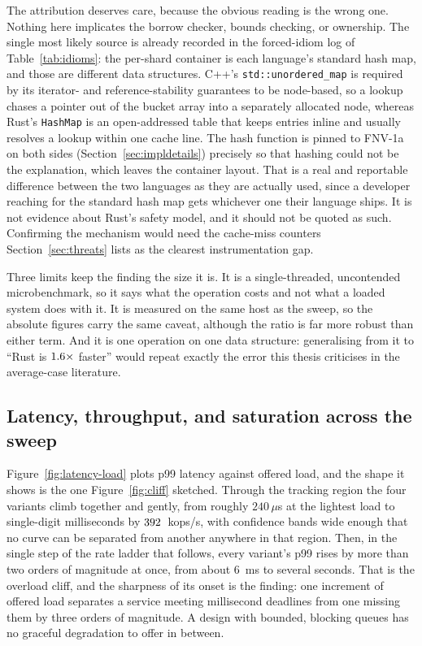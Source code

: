 \documentclass[english,twoside,openright,a4paper,censored,csm,software-track-2020]{HYthesisML}
\begin{document}
The attribution deserves care, because the obvious reading is the wrong one. Nothing here
implicates the borrow checker, bounds checking, or ownership. The single most likely source is
already recorded in the forced-idiom log of Table~\ref{tab:idioms}: the per-shard container is
each language's standard hash map, and those are different data structures. C++'s
\texttt{std::unordered\_map} is required by its iterator- and reference-stability guarantees to
be node-based, so a lookup chases a pointer out of the bucket array into a separately allocated
node, whereas Rust's \texttt{HashMap} is an open-addressed table that keeps entries inline and
usually resolves a lookup within one cache line. The hash function is pinned to FNV-1a on both
sides (Section~\ref{sec:impldetails}) precisely so that hashing could not be the explanation,
which leaves the container layout. That is a real and reportable difference between the two
languages as they are actually used, since a developer reaching for the standard hash map gets
whichever one their language ships. It is not evidence about Rust's safety model, and it should
not be quoted as such. Confirming the mechanism would need the cache-miss counters
Section~\ref{sec:threats} lists as the clearest instrumentation gap.

Three limits keep the finding the size it is. It is a single-threaded, uncontended
microbenchmark, so it says what the operation costs and not what a loaded system does with it.
It is measured on the same host as the sweep, so the absolute figures carry the
same caveat, although the ratio is far more robust than either term. And it is one operation on
one data structure: generalising from it to ``Rust is $1.6\times$ faster'' would repeat exactly the
error this thesis criticises in the average-case literature.

\subsection{Latency, throughput, and saturation across the sweep}
Figure~\ref{fig:latency-load} plots p99 latency against offered load, and the shape it shows is
the one Figure~\ref{fig:cliff} sketched. Through the tracking region the four variants climb
together and gently, from roughly $240\,\mu$s at the lightest load to single-digit milliseconds
by $392$~kops/s, with confidence bands wide enough that no curve can be separated from
another anywhere in that region. Then, in the single step of the rate ladder that follows, every
variant's p99 rises by more than two orders of magnitude at once, from about $6$~ms to several
seconds. That is the overload cliff, and the sharpness of its onset is the finding: one increment
of offered load separates a service meeting millisecond deadlines from one missing them by three
orders of magnitude. A design with bounded, blocking queues has no graceful degradation to offer
in between.
\end{document}
